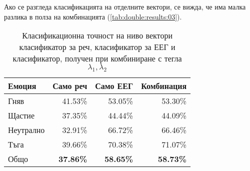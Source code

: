 \documentclass[main.tex]{subfiles}
\begin{document}
Ако се разгледа класификацията на отделните вектори, се вижда, че има малка разлика в полза на комбинацията (\autoref{tab:double:results:03}).

\begin{table}[h]
	\begin{center}
		\begin{tabular}{|l|r r r|}
			\hline
			Емоция    & Само реч         & Само ЕЕГ         & Комбинация     \\
			\hline
			Гняв      & 41.53\%          & 53.05\%          & 53.30\%          \\
			Щастие    & 37.35\%          & 44.44\%          & 44.09\%          \\
			Неутрално & 32.91\%           & 66.72\%          & 66.46\%          \\
			Тъга      & 39.66\%          & 70.38\%          & 71.07\%          \\
			\hline
			\hline
			Общо      & \textbf{37.86\%} & \textbf{58.65\%} & \textbf{58.73\%} \\
			\hline
		\end{tabular}
		\caption{Класификационна точност на ниво вектори класификатор за реч, класификатор за ЕЕГ и класификатор, получен при комбиниране с тегла $\lambda_1, \lambda_2$}
		\label{tab:double:results:03}
	\end{center}
\end{table}
\end{document}
